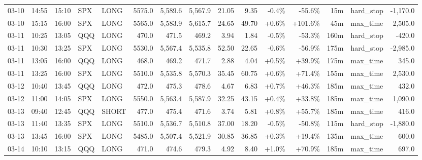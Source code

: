\documentclass[11pt,a4paper,twoside]{article}
\begin{document}
\begin{landscape}
\begin{center}
\begin{longtable}{>{\color{txtmain}}l l l l l r r r r r r r r >{\color{txtmain}}l r}
03-10 & 14:55 & 15:10 & SPX & LONG & 5575.0 & 5,589.6 & 5,567.9 & 21.05 & 9.35 & \textcolor{lossred}{-0.4\%} & \textcolor{lossred}{-55.6\%} & 15m & hard\_stop & \textcolor{lossred}{-1,170.0} \\
03-10 & 15:15 & 16:00 & SPX & LONG & 5565.0 & 5,583.9 & 5,615.7 & 24.65 & 49.70 & \textcolor{wingreen}{+0.6\%} & \textcolor{wingreen}{+101.6\%} & 45m & max\_time & \textcolor{wingreen}{2,505.0} \\
03-11 & 10:25 & 13:05 & QQQ & LONG & 470.0 & 471.5 & 469.2 & 3.94 & 1.84 & \textcolor{lossred}{-0.5\%} & \textcolor{lossred}{-53.3\%} & 160m & hard\_stop & \textcolor{lossred}{-420.0} \\
03-11 & 10:30 & 13:25 & SPX & LONG & 5530.0 & 5,567.4 & 5,535.8 & 52.50 & 22.65 & \textcolor{lossred}{-0.6\%} & \textcolor{lossred}{-56.9\%} & 175m & hard\_stop & \textcolor{lossred}{-2,985.0} \\
03-11 & 13:05 & 16:00 & QQQ & LONG & 468.0 & 469.2 & 471.7 & 2.88 & 4.04 & \textcolor{wingreen}{+0.5\%} & \textcolor{wingreen}{+39.9\%} & 175m & max\_time & \textcolor{wingreen}{345.0} \\
03-11 & 13:25 & 16:00 & SPX & LONG & 5510.0 & 5,535.8 & 5,570.3 & 35.45 & 60.75 & \textcolor{wingreen}{+0.6\%} & \textcolor{wingreen}{+71.4\%} & 155m & max\_time & \textcolor{wingreen}{2,530.0} \\
03-12 & 10:40 & 13:45 & QQQ & LONG & 472.0 & 475.3 & 478.6 & 4.67 & 6.83 & \textcolor{wingreen}{+0.7\%} & \textcolor{wingreen}{+46.3\%} & 185m & max\_time & \textcolor{wingreen}{432.0} \\
03-12 & 11:00 & 14:05 & SPX & LONG & 5550.0 & 5,563.4 & 5,587.9 & 32.25 & 43.15 & \textcolor{wingreen}{+0.4\%} & \textcolor{wingreen}{+33.8\%} & 185m & max\_time & \textcolor{wingreen}{1,090.0} \\
03-13 & 09:40 & 12:45 & QQQ & SHORT & 477.0 & 475.4 & 471.6 & 3.74 & 5.81 & \textcolor{wingreen}{+0.8\%} & \textcolor{wingreen}{+55.7\%} & 185m & max\_time & \textcolor{wingreen}{416.0} \\
03-13 & 11:40 & 13:35 & SPX & LONG & 5510.0 & 5,536.7 & 5,510.8 & 37.00 & 18.20 & \textcolor{lossred}{-0.5\%} & \textcolor{lossred}{-50.8\%} & 115m & hard\_stop & \textcolor{lossred}{-1,880.0} \\
03-13 & 13:45 & 16:00 & SPX & LONG & 5485.0 & 5,507.4 & 5,521.9 & 30.85 & 36.85 & \textcolor{wingreen}{+0.3\%} & \textcolor{wingreen}{+19.4\%} & 135m & max\_time & \textcolor{wingreen}{600.0} \\
03-14 & 10:10 & 13:15 & QQQ & LONG & 471.0 & 474.6 & 479.3 & 4.92 & 8.40 & \textcolor{wingreen}{+1.0\%} & \textcolor{wingreen}{+70.9\%} & 185m & max\_time & \textcolor{wingreen}{697.0} \\

\end{longtable}
\end{center}
\end{landscape}
\end{document}
